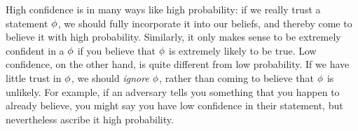 \documentclass{article}
\begin{document}
High confidence is in many ways like high probability: if we really trust a statement $\phi$, we should fully incorporate it into our beliefs, and thereby come to believe it with high probability. 
Similarly, it only makes sense to be extremely confident in a $\phi$ if you believe that $\phi$ is extremely likely to be true. 
Low confidence, on the other hand, is quite different from low probability. 
If we have little trust in $\phi$, we should \emph{ignore} $\phi$, rather than coming to believe that $\phi$ is unlikely.
For example, if an adversary tells you something that you happen to already believe,
you might say you have low confidence in their statement, but nevertheless ascribe it high probability. 


\end{document}
